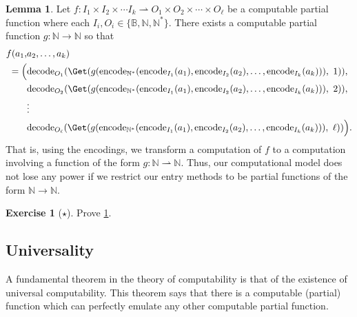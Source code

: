 \documentclass[11pt,a4paper,reqno]{amsart}
\theoremstyle{plain}
\theoremstyle{definition}
\newtheorem{lemma}[theorem]{Lemma}
\theoremstyle{definition}
\newtheorem{exercise}[theorem]{Exercise}
\newcommand\exerciseLevelEasy{$\star$}
\begin{document}
\begin{lemma}\label{lem:reduction-in-complex}
  Let $f\colon I_1\times I_2 \times\cdots I_k \rightharpoonup O_1\times O_2 \times \cdots \times O_\ell$ be a computable partial function where each $I_i,O_i \in \{\mathbb B, \mathbb N, \mathbb N^*\}$.
  There exists a computable partial function $g\colon \mathbb N\to\mathbb N$ so that
  \begin{align*}
    f(a_1,&a_2,\ldots,a_k)\\
      =
      \Big(
        &
          \mathrm{decode}_{O_1}(\Get(
              g(\mathrm{encode}_{\mathbb N^*}(
                \mathrm{encode}_{I_1}(a_1),
                \mathrm{encode}_{I_2}(a_2),
                \ldots,
                \mathrm{encode}_{I_k}(a_k)
              ))
        ,\ 1)),
        \\
        &
          \mathrm{decode}_{O_2}(\Get(
              g(\mathrm{encode}_{\mathbb N^*}(
                \mathrm{encode}_{I_1}(a_1),
                \mathrm{encode}_{I_2}(a_2),
                \ldots,
                \mathrm{encode}_{I_k}(a_k)
              ))
        ,\ 2)),
        \\
        &\vdots
        \\
        &
          \mathrm{decode}_{O_\ell}(\Get(
              g(\mathrm{encode}_{\mathbb N^*}(
                \mathrm{encode}_{I_1}(a_1),
                \mathrm{encode}_{I_2}(a_2),
                \ldots,
                \mathrm{encode}_{I_k}(a_k)
              ))
        ,\ \ell))
        \Big).
    \end{align*}
    That is, using the encodings, we transform a computation of $f$ to a computation involving a function of the form $g\colon \mathbb N \rightharpoonup \mathbb N$.
    Thus, our computational model does not lose any power if we restrict our entry methods to be partial functions of the form $\mathbb N \to\mathbb N$.
\end{lemma}
\begin{exercise}[\exerciseLevelEasy]
  Prove \cref{lem:reduction-in-complex}.
\end{exercise}

\subsection{Universality}

A fundamental theorem in the theory of computability is that of the existence of universal computability.
This theorem says that there is a computable (partial) function which can perfectly emulate any other computable partial function.
\end{document}
